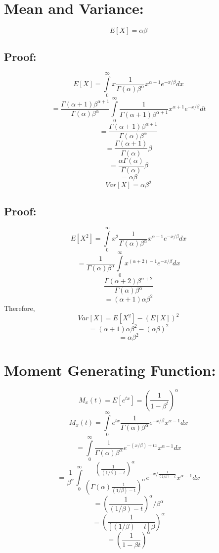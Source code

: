 \documentclass{article}
\begin{document}
  \section*{Mean and Variance:}
  \[
    E[X] = \alpha \beta 
  \]
  \subsection*{Proof:}
  \[
    E[X] = \int\limits_0^\infty {x\frac{1}{\Gamma(\alpha)\beta^\alpha}
                                 x^{\alpha-1} e^{-x/\beta} dx}
  \]
  \[
    = \frac{\Gamma(\alpha+1)\beta^{\alpha+1}}{\Gamma(\alpha)\beta^\alpha} 
      \int\limits_0^\infty {
        \frac{1}{\Gamma(\alpha+1)\beta^{\alpha+1}} 
        x^{\alpha+1} e^{-x/\beta}
      dt}
  \]
  \[
    = \frac{\Gamma(\alpha+1)\beta^{\alpha+1}}{\Gamma(\alpha)\beta^\alpha}
  \]
  \[
    = \frac{\Gamma(\alpha+1)}{\Gamma(\alpha)}\beta
  \]
  \[
    = \frac{\alpha\Gamma(\alpha)}{\Gamma(\alpha)}\beta
  \]
  \[
    = \alpha\beta
  \]
  \wl
  \[
    Var[X] = \alpha \beta^2
  \]
  \subsection*{Proof:}
  \[
    E[X^2] = \int\limits_0^\infty {x^2\frac{1}{\Gamma(\alpha)\beta^\alpha}
                                 x^{\alpha-1} e^{-x/\beta} dx}
  \]
  \[
    = \frac{1}{\Gamma(\alpha)\beta^{\alpha}} 
      \int\limits_0^\infty { x^{(\alpha+2)-1} e^{-x/\beta}dx}
  \]
  \[
    \frac{\Gamma(\alpha+2)\beta^{\alpha+2}}{\Gamma(\alpha)\beta^{\alpha}}
  \]
  \[
    = (\alpha+1)\alpha\beta^2
  \]
  \wl
  Therefore,
  \[
    Var[X] = E[X^2] - (E[X])^2
  \]
  \[
    =(\alpha+1)\alpha\beta^2 - (\alpha\beta)^2
  \]
  \[
    = \alpha\beta^2
  \]
  \section*{Moment Generating Function:}
  \[
    M_x(t) = E[e^{tx}] = {\left( \frac{1}{1-\beta^t} \right)} ^ \alpha
  \]
  \[
    M_x(t) = \int\limits_0^\infty { e^{tx} \frac{1}{\Gamma(\alpha)\beta^\alpha} 
                                    e^{-x/\beta} x^{\alpha-1}dx}
  \]
  \[
    = \int\limits_0^\infty { \frac{1}{\Gamma(\alpha)\beta^\alpha} 
                             e^{-(x/\beta) + tx}x^{\alpha-1}dx}
  \]
  \[
    = \frac{1}{\beta^\alpha} \int\limits_0^\infty { 
      \frac{ \left( {\frac{1}{(1/\beta)-t}} \right)^\alpha } 
            {\left( \Gamma(\alpha){\frac{1}{(1/\beta)-t}} \right) ^\alpha}
      e^{-x/\frac{1}{(1/\beta)-t} } x ^ {\alpha-1} dx}
  \]
  \[
    = \left( {\frac{1}{(1/\beta)-t}} \right)^\alpha / \beta^\alpha
  \]
  \[
    = \left( {\frac{1}{[(1/\beta)-t]\beta}} \right)^\alpha
  \]
  \[
    = \left( \frac{1}{1-\beta t}\right) ^ \alpha
  \]
\end{document}
